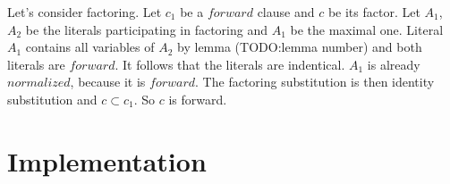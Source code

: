 \documentclass[english, shortabstract]{iithesis}
\theoremstyle{definition} \newtheorem{definition}{Definition}[chapter]
\theoremstyle{remark} \newtheorem{remark}[definition]{Observation}
\theoremstyle{plain} \newtheorem{theorem}[definition]{Theorem}
\theoremstyle{plain} \newtheorem{lemma}[definition]{Lemma}
\begin{document}
\par Let's consider factoring. Let $c_1$ be a $forward$ clause and $c$ be its factor.
Let $A_1$, $A_2$ be the literals participating in factoring and $A_1$ be the maximal one.
Literal $A_1$ contains all variables of $A_2$ by lemma (TODO:lemma number) and both literals are $forward$. 
It follows that the literals are indentical. $A_1$ is already $normalized$, because it is $forward$.
The factoring substitution is then identity substitution and $c\subset c_1$. So $c$ is forward.

\chapter{Implementation}




\end{document}
